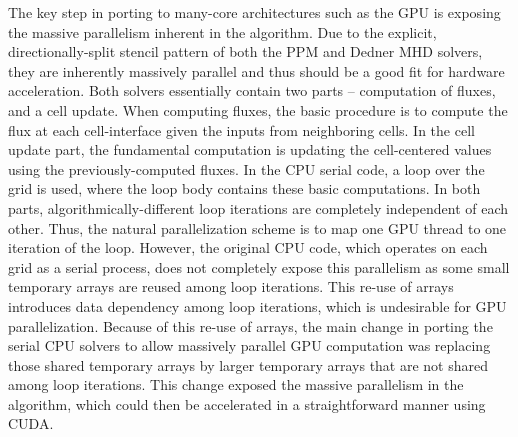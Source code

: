 The key step in porting to many-core architectures such as the GPU is
exposing the massive parallelism inherent in the algorithm. Due to the
explicit, directionally-split stencil pattern of both the PPM and
Dedner MHD solvers, they are inherently massively parallel and thus
should be a good fit for hardware acceleration. Both solvers essentially
contain two parts -- computation of fluxes, and a cell update.
When computing fluxes, the basic procedure is to compute the flux at
each cell-interface given the inputs from neighboring cells. In the
cell update part, the fundamental computation is updating the
cell-centered values using the previously-computed fluxes. In the CPU
serial code, a loop over the grid is used, where the loop body
contains these basic computations. In both parts,
algorithmically-different loop iterations are completely independent
of each other. Thus, the natural parallelization scheme is to map
one GPU thread to one iteration of the loop. However, the original CPU
code, which operates on each grid as a serial process, does not
completely expose this parallelism as some small temporary arrays are
reused among loop iterations.  This re-use of arrays introduces data
dependency among loop iterations, which is undesirable for GPU
parallelization.  Because of this re-use of arrays, the main change in
porting the serial CPU solvers to allow massively parallel GPU
computation was replacing those shared temporary arrays by larger
temporary arrays that are not shared among loop iterations. This
change exposed the massive parallelism in the algorithm, which could
then be accelerated in a straightforward manner using CUDA.

